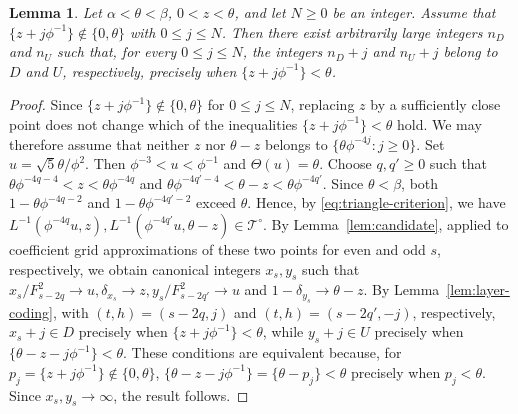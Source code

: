 \documentclass[11pt]{amsart}
\newtheorem{lemma}[theorem]{Lemma}
\theoremstyle{definition}
\newcommand{\Tcal}{\mathcal T}
\begin{document}
\begin{lemma}\label{lem:finite-realization}
Let $\alpha<\theta<\beta$, $0<z<\theta$, and let $N\geq0$ be an integer. Assume that $\{z+j\phi^{-1}\}\notin\{0,\theta\}$ with $0\leq j\leq N$. Then there exist arbitrarily large integers $n_D$ and $n_U$ such that, for every $0\leq j\leq N$, the integers $n_D+j$ and $n_U+j$ belong to $D$ and $U$, respectively, precisely when $\{z+j\phi^{-1}\}<\theta$.
\end{lemma}
\begin{proof}
Since $\{z+j\phi^{-1}\}\notin\{0,\theta\}$ for $0\leq j\leq N$,
replacing $z$ by a sufficiently close point does not change which of the inequalities $\{z+j\phi^{-1}\}<\theta$ hold. We may therefore assume that neither $z$ nor
$\theta-z$ belongs to $\{\theta\phi^{-4j}:j\geq0\}$. Set $u=\sqrt5\theta/\phi^2$. Then $\phi^{-3}<u<\phi^{-1}$ and $\Theta(u)=\theta$. Choose $q,q'\geq0$ such that $\theta\phi^{-4q-4}<z<\theta\phi^{-4q}$ and $\theta\phi^{-4q'-4}<\theta-z<\theta\phi^{-4q'}$. Since $\theta<\beta$, both $1-\theta\phi^{-4q-2}$ and $1-\theta\phi^{-4q'-2}$ exceed $\theta$. Hence, by \eqref{eq:triangle-criterion}, we have $L^{-1}(\phi^{-4q}u,z), L^{-1}(\phi^{-4q'}u,\theta-z)\in\Tcal^\circ$. By Lemma~\ref{lem:candidate}, applied to coefficient grid approximations of these two points for even and odd $s$, respectively, we obtain canonical integers $x_s,y_s$ such that $x_s/F_{s-2q}^2\to u, \delta_{x_s}\to z, y_s/F_{s-2q'}^2\to u$ and $1-\delta_{y_s}\to\theta-z$. By Lemma~\ref{lem:layer-coding}, with $(t,h)=(s-2q,j)$ and
$(t,h)=(s-2q',-j)$, respectively, $x_s+j\in D$ precisely when
$\{z+j\phi^{-1}\}<\theta$, while $y_s+j\in U$ precisely when
$\{\theta-z-j\phi^{-1}\}<\theta$. These conditions are equivalent
because, for $p_j=\{z+j\phi^{-1}\}\notin\{0,\theta\}$,
$\{\theta-z-j\phi^{-1}\}=\{\theta-p_j\}<\theta$ precisely when
$p_j<\theta$. Since $x_s,y_s\to\infty$, the result follows.
\end{proof}
\end{document}
